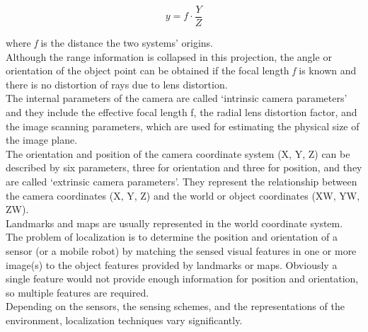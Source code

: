 \[
y = f \cdot \frac{Y}{Z}
\]

where \textit{f} is the distance the two systems' origins.
\\
Although the range information is collapsed in this projection, the angle or
orientation of the object point can be obtained if the focal length \textit{f}
is known and there is no distortion of rays due to lens distortion.
\\
The internal parameters of the camera are called `intrinsic camera parameters' and
they include the effective focal length f, the radial lens distortion factor,
and the image scanning parameters, which are used for estimating the physical
size of the image plane.
\\
The orientation and position of the camera coordinate system (X, Y, Z) can be
described by six parameters, three for orientation and three for position, and
they are called `extrinsic camera parameters'. They represent the relationship
between the camera coordinates (X, Y, Z) and the world or object coordinates
(XW, YW, ZW).
\\
Landmarks and maps are usually represented in the world coordinate system.
The problem of localization is to determine the position and orientation of a
sensor (or a mobile robot) by matching the sensed visual features in one or
more image(s) to the object features provided by landmarks or maps. Obviously a
single feature would not provide enough information for position
and orientation, so multiple features are required.
\\
Depending on the sensors, the sensing schemes, and the representations of the
environment, localization techniques vary significantly.
